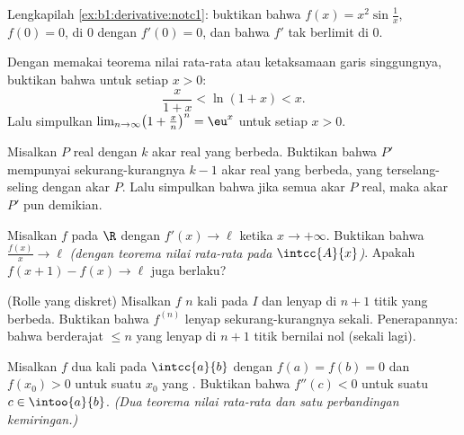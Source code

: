 \begin{exercise}[$\star$]\label{exo:b1:derivative:2}
Lengkapilah \cref{ex:b1:derivative:notc1}: buktikan bahwa $f(x) = x^2
\sin\frac1x$, $f(0) = 0$,  di $0$ dengan $f'(0) = 0$,
dan bahwa $f'$ tak berlimit di $0$.
\end{exercise}

\begin{exercise}[$\star$]\label{exo:b1:derivative:3}
Dengan memakai teorema nilai rata-rata atau ketaksamaan garis singgungnya, buktikan bahwa
untuk setiap $x > 0$:
\[
\frac{x}{1 + x} < \ln(1 + x) < x .
\]
Lalu simpulkan $\lim_{n\to\infty} \bigl(1 + \frac xn\bigr)^n = \eu^x$ untuk
setiap $x > 0$.
\end{exercise}

\begin{exercise}[$\star$]\label{exo:b1:derivative:4}
Misalkan $P$  real dengan $k$ akar real yang berbeda. Buktikan bahwa
$P'$ mempunyai sekurang-kurangnya $k - 1$ akar real yang berbeda, yang terselang-seling dengan akar
$P$. Lalu simpulkan bahwa jika semua akar $P$ real, maka akar $P'$ pun demikian.
\end{exercise}

\begin{exercise}[$\star\star$]\label{exo:b1:derivative:5}
Misalkan $f$  pada $\R$ dengan $f' (x)\to \ell$ ketika $x \to
+\infty$. Buktikan bahwa $\frac{f(x)}{x} \to \ell$ \emph{(dengan teorema nilai
rata-rata pada $\intcc{A}{x}$)}. Apakah $f(x+1) - f(x) \to \ell$ juga berlaku?
\end{exercise}

\begin{exercise}[$\star\star$]\label{exo:b1:derivative:6}
(Rolle yang diskret) Misalkan $f$  $n$ kali pada $I$ dan
lenyap di $n + 1$ titik yang berbeda. Buktikan bahwa $f^{(n)}$ lenyap
sekurang-kurangnya sekali. Penerapannya: bahwa  berderajat $\leq n$ yang lenyap di
$n+1$ titik bernilai nol (sekali lagi).
\end{exercise}

\begin{exercise}[$\star\star$]\label{exo:b1:derivative:7}
Misalkan $f$  dua kali pada $\intcc{a}{b}$ dengan $f(a) = f(b)
= 0$ dan $f(x_0) > 0$ untuk suatu $x_0$ yang . Buktikan bahwa $f''(c) <
0$ untuk suatu $c \in \intoo{a}{b}$. \emph{(Dua teorema nilai rata-rata dan
satu perbandingan kemiringan.)}
\end{exercise}

